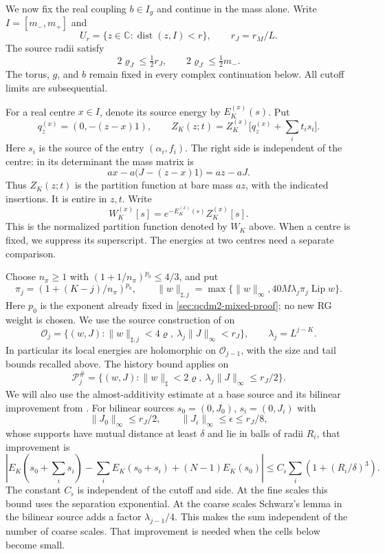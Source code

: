 \documentclass[11pt,letterpaper,reqno]{amsart}
\theoremstyle{definition}
\theoremstyle{remark}
\begin{document}
We now fix the real coupling \(b\in I_g\) and continue in the
mass alone. Write \(I=[m_-,m_+]\) and
\[
 U_r=\{z\in\mathbb C:\operatorname{dist}(z,I)<r\},
 \qquad r_J=r_M/L.
\]
The source radii satisfy
\[
 2\varrho_J\le \tfrac12r_J,\qquad
 2\varrho_J\le\tfrac12m_-.
\]
The torus, \(g\), and \(b\) remain fixed in every complex
continuation below. All cutoff limits are subsequential.

For a real centre \(x\in I\), denote its source energy by
\(E_K^{(x)}(s)\). Put
\[
 q_z^{(x)}=(0,-(z-x)1),\qquad
 Z_K(z;t)=Z_K^{(x)}\bigl[q_z^{(x)}+\textstyle\sum_i t_is_i\bigr].
\]
Here \(s_i\) is the source of the entry \((\alpha_i,f_i)\).
The right side is independent of the centre: in its determinant
the mass matrix is
\[
 ax-a\bigl(J-(z-x)1\bigr)=az-aJ.
\]
Thus \(Z_K(z;t)\) is the partition function at bare mass \(az\),
with the indicated insertions. It is entire in \(z,t\).
Write
\[
 W_K^{(x)}[s]=e^{-E_K^{(x)}(s)}Z_K^{(x)}[s].
\]
This is the normalized partition function denoted by $W_K$
above. When a centre is fixed, we suppress its superscript.
The energies at two centres need a separate comparison.

Choose $n_\pi\ge1$ with
$(1+1/n_\pi)^{p_0}\le4/3$, and put
\[
 \pi_j=(1+(K-j)/n_\pi)^{p_0},\qquad
 \|w\|_{\sharp,j}
 =\max\{\|w\|_\infty,40M\lambda_j\pi_j\operatorname{Lip}w\}.
\]
Here $p_0$ is the exponent already fixed in \cref{sec:qcdm2-mixed-proof};
no new RG weight is chosen.
We use the source construction of \cite{QCDM1} on
\[
 \mathscr O_j=\{(w,J):\|w\|_{\sharp,j}<4\varrho,\
                         \lambda_j\|J\|_\infty<r_J\},
 \qquad \lambda_j=L^{j-K}.
\]
In particular its local energies are holomorphic on
\(\mathscr O_{j-1}\), with the size and tail bounds recalled
above. The history bound applies on
\[
 \mathcal P^\#_j
 =\{(w,J):\|w\|_\sharp<2\varrho,\
                       \lambda_j\|J\|_\infty\le r_J/2\}.
\]
We will also use the almost-additivity estimate at a base source
and its bilinear improvement from
\cite[Props. 10.15 and 10.18]{QCDM1}.
For bilinear sources \(s_0=(0,J_0)\), \(s_i=(0,J_i)\) with
\[
 \|J_0\|_\infty\le r_J/2,\qquad
 \|J_i\|_\infty\le\epsilon\le r_J/8,
\]
whose supports have mutual distance at least \(\delta\) and
lie in balls of radii \(R_i\), that improvement is
\begin{equation}\label{eq:qcdm2-mass-additivity}
 \left|E_K\left(s_0+\sum_i s_i\right)
       -\sum_iE_K(s_0+s_i)+(N-1)E_K(s_0)\right|
 \le C_\flat\sum_i\left(1+(R_i/\delta)^3\right).
\end{equation}
The constant \(C_\flat\) is independent of the cutoff and side.
At the fine scales this bound uses the separation exponential.
At the coarse scales Schwarz's lemma in the bilinear source
adds a factor \(\lambda_{j-1}/4\). This makes the sum independent
of the number of coarse scales. That improvement is needed
when the cells below become small.
\end{document}
